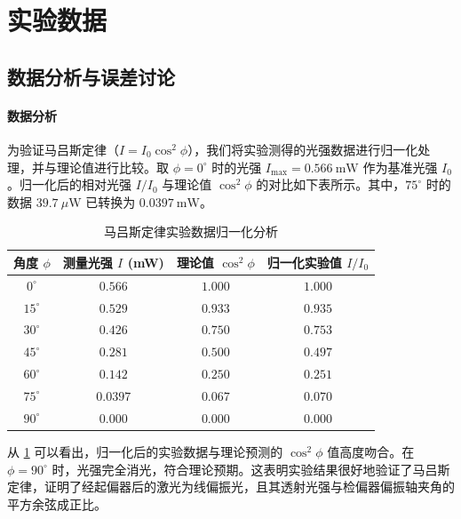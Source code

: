 \documentclass[11pt]{article}
\begin{document}
\section{实验数据}


\subsection{数据分析与误差讨论}
\paragraph{数据分析}
为验证马吕斯定律（\(I = I_0 \cos^2\phi\)），我们将实验测得的光强数据进行归一化处理，并与理论值进行比较。取 \(\phi=0^\circ\) 时的光强 \(I_{\text{max}} = 0.566\ \text{mW}\) 作为基准光强 \(I_0\)。归一化后的相对光强 \(I/I_0\) 与理论值 \(\cos^2\phi\) 的对比如下表所示。其中，\(75^\circ\) 时的数据 \(39.7\ \mu\text{W}\) 已转换为 \(0.0397\ \text{mW}\)。

\begin{table}[H]
  \centering
  \caption{马吕斯定律实验数据归一化分析}
  \vspace{0.5em}
  \label{tab:malus_analysis}
  \begin{tabular}{c c c c}
    \toprule
    \textbf{角度 \(\phi\)} & \textbf{测量光强 \(I\) (mW)} & \textbf{理论值 \(\cos^2\phi\)} & \textbf{归一化实验值 \(I/I_0\)} \\
    \midrule
    \(0^\circ\)   & \(0.566\) & \(1.000\) & \(1.000\) \\
    \(15^\circ\)  & \(0.529\) & \(0.933\) & \(0.935\) \\
    \(30^\circ\)  & \(0.426\) & \(0.750\) & \(0.753\) \\
    \(45^\circ\)  & \(0.281\) & \(0.500\) & \(0.497\) \\
    \(60^\circ\)  & \(0.142\) & \(0.250\) & \(0.251\) \\
    \(75^\circ\)  & \(0.0397\) & \(0.067\) & \(0.070\) \\ 
    \(90^\circ\)  & \(0.000\) & \(0.000\) & \(0.000\) \\
    \bottomrule
  \end{tabular}
\end{table}

从 \cref{tab:malus_analysis} 可以看出，归一化后的实验数据与理论预测的 \(\cos^2\phi\) 值高度吻合。在 \(\phi=90^\circ\) 时，光强完全消光，符合理论预期。这表明实验结果很好地验证了马吕斯定律，证明了经起偏器后的激光为线偏振光，且其透射光强与检偏器偏振轴夹角的平方余弦成正比。
\end{document}
